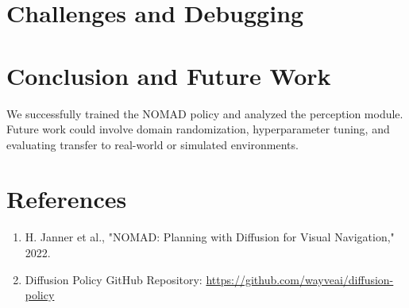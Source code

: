 \documentclass[12pt]{article}
\begin{document}
\section{Challenges and Debugging}


\section{Conclusion and Future Work}
We successfully trained the NOMAD policy and analyzed the perception module. Future work could involve domain randomization, hyperparameter tuning, and evaluating transfer to real-world or simulated environments.

\section*{References}
\begin{enumerate}
\item H. Janner et al., "NOMAD: Planning with Diffusion for Visual Navigation," 2022.
\item Diffusion Policy GitHub Repository: \url{https://github.com/wayveai/diffusion-policy}
\end{enumerate}
\end{document}
